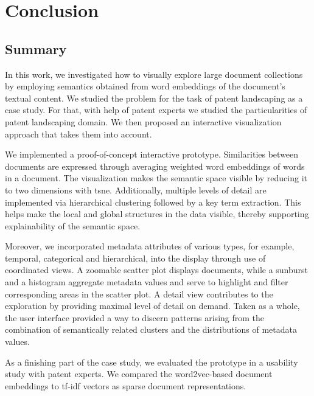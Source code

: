 
\chapter{Conclusion}
\label{ch:conclusion}

\section{Summary}

In this work, we investigated how to visually explore large document collections by employing semantics obtained from word embeddings of the document's textual content.
We studied the problem for the task of patent landscaping as a case study.
For that, with help of patent experts we studied the particularities of patent landscaping domain.
We then proposed an interactive visualization approach that takes them into account.

We implemented a proof-of-concept interactive prototype.
Similarities between documents are expressed through averaging weighted word embeddings of words in a document.
The visualization makes the semantic space visible by reducing it to two dimensions with \gls{tsne}.
Additionally, multiple levels of detail are implemented via hierarchical clustering followed by a key term extraction.
This helps make the local and global structures in the data visible, thereby supporting explainability of the semantic space.

Moreover, we incorporated metadata attributes of various types, for example, temporal, categorical and hierarchical, into the display through use of coordinated views.
A zoomable scatter plot displays documents, while a sunburst and a histogram aggregate metadata values and serve to highlight and filter corresponding areas in the scatter plot.
A detail view contributes to the exploration by providing maximal level of detail on demand.
Taken as a whole, the user interface provided a way to discern patterns arising from the combination of semantically related clusters and the distributions of metadata values.

As a finishing part of the case study, we evaluated the prototype in a usability study with patent experts.
We compared the word2vec-based document embeddings to \gls{tf-idf} vectors as sparse document representations.

